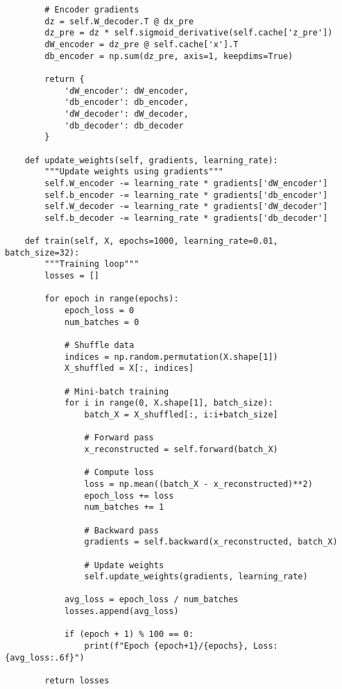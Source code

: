 ﻿\documentclass[12pt,a4paper]{article}
\begin{document}
\begin{lstlisting}
        # Encoder gradients
        dz = self.W_decoder.T @ dx_pre
        dz_pre = dz * self.sigmoid_derivative(self.cache['z_pre'])
        dW_encoder = dz_pre @ self.cache['x'].T
        db_encoder = np.sum(dz_pre, axis=1, keepdims=True)
        
        return {
            'dW_encoder': dW_encoder,
            'db_encoder': db_encoder,
            'dW_decoder': dW_decoder,
            'db_decoder': db_decoder
        }
    
    def update_weights(self, gradients, learning_rate):
        """Update weights using gradients"""
        self.W_encoder -= learning_rate * gradients['dW_encoder']
        self.b_encoder -= learning_rate * gradients['db_encoder']
        self.W_decoder -= learning_rate * gradients['dW_decoder']
        self.b_decoder -= learning_rate * gradients['db_decoder']
    
    def train(self, X, epochs=1000, learning_rate=0.01, batch_size=32):
        """Training loop"""
        losses = []
        
        for epoch in range(epochs):
            epoch_loss = 0
            num_batches = 0
            
            # Shuffle data
            indices = np.random.permutation(X.shape[1])
            X_shuffled = X[:, indices]
            
            # Mini-batch training
            for i in range(0, X.shape[1], batch_size):
                batch_X = X_shuffled[:, i:i+batch_size]
                
                # Forward pass
                x_reconstructed = self.forward(batch_X)
                
                # Compute loss
                loss = np.mean((batch_X - x_reconstructed)**2)
                epoch_loss += loss
                num_batches += 1
                
                # Backward pass
                gradients = self.backward(x_reconstructed, batch_X)
                
                # Update weights
                self.update_weights(gradients, learning_rate)
            
            avg_loss = epoch_loss / num_batches
            losses.append(avg_loss)
            
            if (epoch + 1) % 100 == 0:
                print(f"Epoch {epoch+1}/{epochs}, Loss: {avg_loss:.6f}")
        
        return losses
    

\end{lstlisting}
\end{document}
